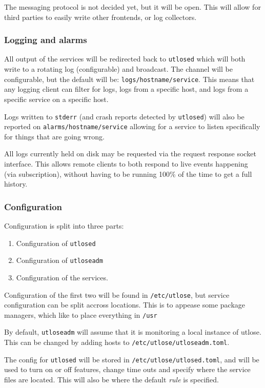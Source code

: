 \documentclass{article}
\begin{document}
The messaging protocol is not decided yet, but it will be open. This will allow for third parties to easily
write other frontends, or log collectors.

\subsubsection{Logging and alarms}
All output of the services will be redirected back to \texttt{utlosed} which will both write to a rotating log
(configurable) and broadcast. The channel will be configurable, but the default will be: \texttt{logs/hostname/service}.
This means that any logging client can filter for logs, logs from a specific host, and logs from a specific service on a specific
host.

Logs written to \texttt{stderr} (and crash reports detected by \texttt{utlosed}) will also be reported on \texttt{alarms/hostname/service}
allowing for a service to listen specifically for things that are going wrong.

All logs currently held on disk may be requested via the request response socket interface. This allows remote clients to both
respond to live events happening (via subscription), without having to be running 100\% of the time to get a full history.

\subsubsection{Configuration}
Configuration is split into three parts:
\begin{enumerate}
  \item Configuration of \texttt{utlosed}
  \item Configuration of \texttt{utloseadm}
  \item Configuration of the services.
\end{enumerate}

Configuration of the first two will be found in \texttt{/etc/utlose}, but service configuration can be split
accross locations. This is to appease some package managers, which like to place everything in \texttt{/usr}

By default, \texttt{utloseadm} will assume that it is monitoring a local instance of utlose. This can be changed
by adding hosts to \texttt{/etc/utlose/utloseadm.toml}.

The config for \texttt{utlosed} will be stored in \texttt{/etc/utlose/utlosed.toml}, and will be used to turn on or off features,
change time outs and specify where the service files are located. This will also be where the default \textit{rule} is specified.
\end{document}
